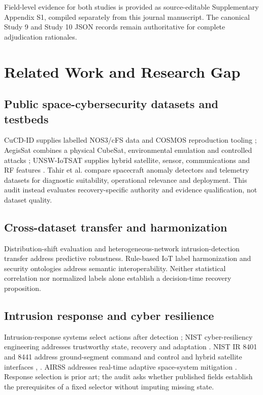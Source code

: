 \documentclass[preprint,12pt]{elsarticle}
\begin{document}
Field-level evidence for both studies is provided as source-editable Supplementary Appendix S1, compiled separately from this journal manuscript. The canonical Study 9 and Study 10 JSON records remain authoritative for complete adjudication rationales.

\section{Related Work and Research Gap}

\subsection{Public space-cybersecurity datasets and testbeds}
CuCD-ID supplies labelled NOS3/cFS data and COSMOS reproduction tooling \cite{fayyaz2026cucd}; AegisSat combines a physical CubeSat, environmental emulation and controlled attacks \cite{idan2025aegissat}; UNSW-IoTSAT supplies hybrid satellite, sensor, communications and RF features \cite{abdelhameed2026unsw}. Tahir et al. \cite{tahir2025benchmark} compare spacecraft anomaly detectors and telemetry datasets for diagnostic suitability, operational relevance and deployment. This audit instead evaluates recovery-specific authority and evidence qualification, not dataset quality.

\subsection{Cross-dataset transfer and harmonization}
Distribution-shift evaluation \cite{koh2021wilds} and heterogeneous-network intrusion-detection transfer \cite{cerasuolo2026transfer} address predictive robustness. Rule-based IoT label harmonization \cite{rodriguez2026harmonization} and security ontologies \cite{akbar2023ontology} address semantic interoperability. Neither statistical correlation nor normalized labels alone establish a decision-time recovery proposition.

\subsection{Intrusion response and cyber resilience}
Intrusion-response systems select actions after detection \cite{bashendy2023irs}; NIST cyber-resiliency engineering addresses trustworthy state, recovery and adaptation \cite{ross2021cyberresilient}. NIST IR 8401 and 8441 address ground-segment command and control and hybrid satellite interfaces \cite{nist2022ground}, \cite{mccarthy2023hsn}. AIRSS addresses real-time adaptive space-system mitigation \cite{sahakian2021airss}. Response selection is prior art; the audit asks whether published fields establish the prerequisites of a fixed selector without imputing missing state.
\end{document}
